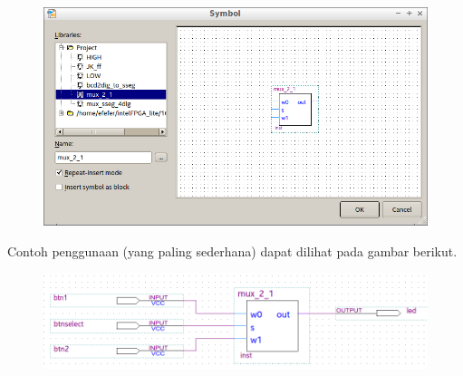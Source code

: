 \begin{figure}[H]
{\centering
\includegraphics[scale=0.5]{images/symbol_mux_2_1.png}
\par}
\end{figure}

Contoh penggunaan (yang paling sederhana) dapat dilihat pada gambar berikut.

\begin{figure}[H]
{\centering
\includegraphics[scale=0.5]{images/tes_mux_2_1.png}
\par}
\end{figure}

